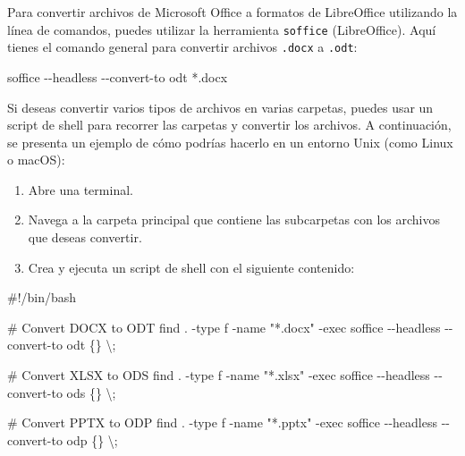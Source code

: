 \documentclass[
  jou,
  floatsintext,
  longtable,
  a4paper,
  nolmodern,
  notxfonts,
  notimes,
  colorlinks=true,linkcolor=blue,citecolor=blue,urlcolor=blue]{apa7}
\newenvironment{Shaded}{\begin{snugshade}}{\end{snugshade}}
\newcommand{\AttributeTok}[1]{\textcolor[rgb]{0.40,0.45,0.13}{#1}}
\newcommand{\CommentTok}[1]{\textcolor[rgb]{0.37,0.37,0.37}{#1}}
\newcommand{\DataTypeTok}[1]{\textcolor[rgb]{0.68,0.00,0.00}{#1}}
\newcommand{\ExtensionTok}[1]{\textcolor[rgb]{0.00,0.23,0.31}{#1}}
\newcommand{\FunctionTok}[1]{\textcolor[rgb]{0.28,0.35,0.67}{#1}}
\newcommand{\NormalTok}[1]{\textcolor[rgb]{0.00,0.23,0.31}{#1}}
\newcommand{\PreprocessorTok}[1]{\textcolor[rgb]{0.68,0.00,0.00}{#1}}
\newcommand{\StringTok}[1]{\textcolor[rgb]{0.13,0.47,0.30}{#1}}
\providecommand{\tightlist}{%
  \setlength{\itemsep}{0pt}\setlength{\parskip}{0pt}}
\begin{document}
Para convertir archivos de Microsoft Office a formatos de LibreOffice
utilizando la línea de comandos, puedes utilizar la herramienta
\texttt{soffice} (LibreOffice). Aquí tienes el comando general para
convertir archivos \texttt{.docx} a \texttt{.odt}:

\begin{Shaded}
\begin{Highlighting}[]
\ExtensionTok{soffice} \AttributeTok{{-}{-}headless} \AttributeTok{{-}{-}convert{-}to}\NormalTok{ odt }\PreprocessorTok{*}\NormalTok{.docx}
\end{Highlighting}
\end{Shaded}

Si deseas convertir varios tipos de archivos en varias carpetas, puedes
usar un script de shell para recorrer las carpetas y convertir los
archivos. A continuación, se presenta un ejemplo de cómo podrías hacerlo
en un entorno Unix (como Linux o macOS):

\begin{enumerate}
\def\labelenumi{\arabic{enumi}.}
\tightlist
\item
  Abre una terminal.
\item
  Navega a la carpeta principal que contiene las subcarpetas con los
  archivos que deseas convertir.
\item
  Crea y ejecuta un script de shell con el siguiente contenido:
\end{enumerate}

\begin{Shaded}
\begin{Highlighting}[]
\CommentTok{\#!/bin/bash}

\CommentTok{\# Convert DOCX to ODT}
\FunctionTok{find}\NormalTok{ . }\AttributeTok{{-}type}\NormalTok{ f }\AttributeTok{{-}name} \StringTok{"*.docx"} \AttributeTok{{-}exec}\NormalTok{ soffice }\AttributeTok{{-}{-}headless} \AttributeTok{{-}{-}convert{-}to}\NormalTok{ odt \{\} }\DataTypeTok{\textbackslash{};}

\CommentTok{\# Convert XLSX to ODS}
\FunctionTok{find}\NormalTok{ . }\AttributeTok{{-}type}\NormalTok{ f }\AttributeTok{{-}name} \StringTok{"*.xlsx"} \AttributeTok{{-}exec}\NormalTok{ soffice }\AttributeTok{{-}{-}headless} \AttributeTok{{-}{-}convert{-}to}\NormalTok{ ods \{\} }\DataTypeTok{\textbackslash{};}

\CommentTok{\# Convert PPTX to ODP}
\FunctionTok{find}\NormalTok{ . }\AttributeTok{{-}type}\NormalTok{ f }\AttributeTok{{-}name} \StringTok{"*.pptx"} \AttributeTok{{-}exec}\NormalTok{ soffice }\AttributeTok{{-}{-}headless} \AttributeTok{{-}{-}convert{-}to}\NormalTok{ odp \{\} }\DataTypeTok{\textbackslash{};}
\end{Highlighting}
\end{Shaded}
\end{document}
